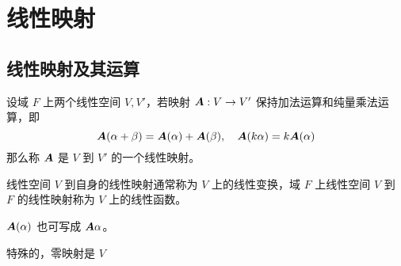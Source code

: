 \chapter{线性映射}

\section{线性映射及其运算}

\begin{definition}
    设域 $F$ 上两个线性空间 $V,V'$，若映射 $\boldsymbol{A} : V \to V'$ 保持加法运算和纯量乘法运算，即
    \[ \boldsymbol{A}(\alpha + \beta) = \boldsymbol{A}(\alpha) + \boldsymbol{A}(\beta), \quad \boldsymbol{A}(k\alpha) = k \boldsymbol{A}(\alpha) \]
    那么称 $\boldsymbol{A}$ 是 $V$ 到 $V'$ 的一个线性映射。
\end{definition}

线性空间 $V$ 到自身的线性映射通常称为 $V$ 上的线性变换，域 $F$ 上线性空间 $V$ 到 $F$ 的线性映射称为 $V$ 上的线性函数。

$\boldsymbol{A}(\alpha)$ 也可写成 $\boldsymbol{A}\alpha$。

特殊的，零映射是 $V$ 
